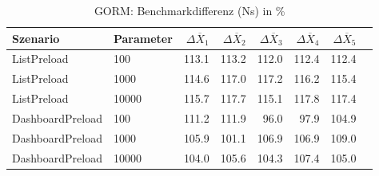 
\begin{table}[ht]
\setlength{\extrarowheight}{-1pt}
\centering
\caption{GORM: Benchmarkdifferenz (Ns) in \%}
\begin{tabular}{llrrrrrr}
\toprule
Szenario & Parameter & ${\Delta \overline{X}_1}$ & ${\Delta \overline{X}_2}$ & ${\Delta \overline{X}_3}$ & ${\Delta \overline{X}_4}$ & ${\Delta \overline{X}_5}$ \\
\midrule
	ListPreload & 100 & \cellcolor{red!15}  113.1 & \cellcolor{red!15}  113.2 & \cellcolor{red!15}  112.0 & \cellcolor{red!15}  112.4 & \cellcolor{red!15}  112.4 \\
	ListPreload & 1000 & \cellcolor{red!16}  114.6 & \cellcolor{red!17}  117.0 & \cellcolor{red!17}  117.2 & \cellcolor{red!16}  116.2 & \cellcolor{red!16}  115.4 \\
	ListPreload & 10000 & \cellcolor{red!16}  115.7 & \cellcolor{red!17}  117.7 & \cellcolor{red!16}  115.1 & \cellcolor{red!17}  117.8 & \cellcolor{red!17}  117.4 \\
	DashboardPreload & 100 & \cellcolor{red!14}  111.2 & \cellcolor{red!15}  111.9 & \cellcolor{green!12}  96.0 & \cellcolor{green!11}  97.9 & \cellcolor{red!12}  104.9 \\
	DashboardPreload & 1000 & \cellcolor{red!12}  105.9 &  101.1 & \cellcolor{red!13}  106.9 & \cellcolor{red!13}  106.9 & \cellcolor{red!14}  109.0 \\
	DashboardPreload & 10000 & \cellcolor{red!12}  104.0 & \cellcolor{red!12}  105.6 & \cellcolor{red!12}  104.3 & \cellcolor{red!13}  107.4 & \cellcolor{red!12}  105.0 \\
\bottomrule
\end{tabular}
\label{tab:benchmarkdifferenz_gorm_ns}
\end{table}
	